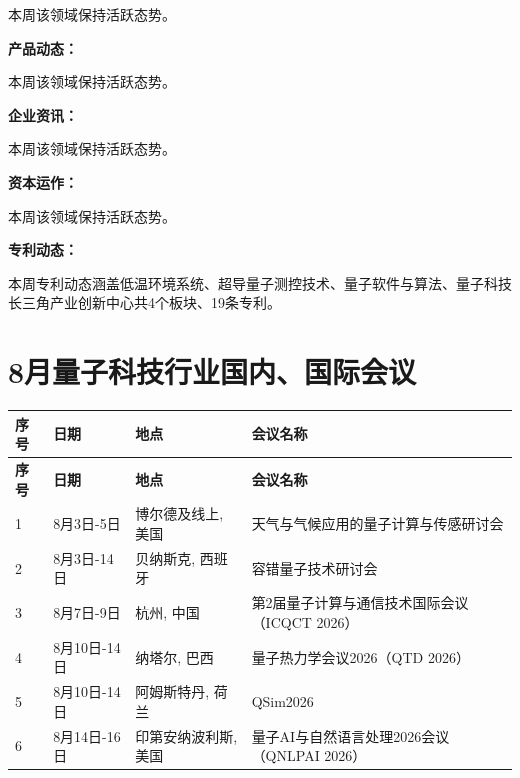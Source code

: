 \documentclass[12pt,a4paper]{ctexart}
\begin{document}
本周该领域保持活跃态势。


\textbf{ 产品动态：}

本周该领域保持活跃态势。


\textbf{ 企业资讯：}

本周该领域保持活跃态势。


\textbf{ 资本运作：}

本周该领域保持活跃态势。




\textbf{ 专利动态：}

本周专利动态涵盖低温环境系统、超导量子测控技术、量子软件与算法、量子科技长三角产业创新中心共4个板块、19条专利。




{
    \newpage
    \section*{ 8月量子科技行业国内、国际会议}
    \scriptsize
    \begin{longtable}{C{0.8cm}L{2.5cm}L{3cm}L{7cm}}
        \toprule[1.5pt]
        \textbf{序号} & \textbf{日期} & \textbf{地点} & \textbf{会议名称} \\
        \midrule
        \endfirsthead
        \toprule
        \textbf{序号} & \textbf{日期} & \textbf{地点} & \textbf{会议名称} \\
        \midrule
        \endhead
        \bottomrule
        \endfoot
        
        1 & 8月3日-5日 & 博尔德及线上, 美国 & 天气与气候应用的量子计算与传感研讨会 \\
        \midrule[0.05pt]
        
        2 & 8月3日-14日 & 贝纳斯克, 西班牙 & 容错量子技术研讨会 \\
        \midrule[0.05pt]
        
        3 & 8月7日-9日 & 杭州, 中国 & 第2届量子计算与通信技术国际会议（ICQCT 2026） \\
        \midrule[0.05pt]
        
        4 & 8月10日-14日 & 纳塔尔, 巴西 & 量子热力学会议2026（QTD 2026） \\
        \midrule[0.05pt]
        
        5 & 8月10日-14日 & 阿姆斯特丹, 荷兰 & QSim2026 \\
        \midrule[0.05pt]
        
        6 & 8月14日-16日 & 印第安纳波利斯, 美国 & 量子AI与自然语言处理2026会议（QNLPAI 2026） \\
        \midrule[0.05pt]
        

\end{longtable}}
\end{document}

